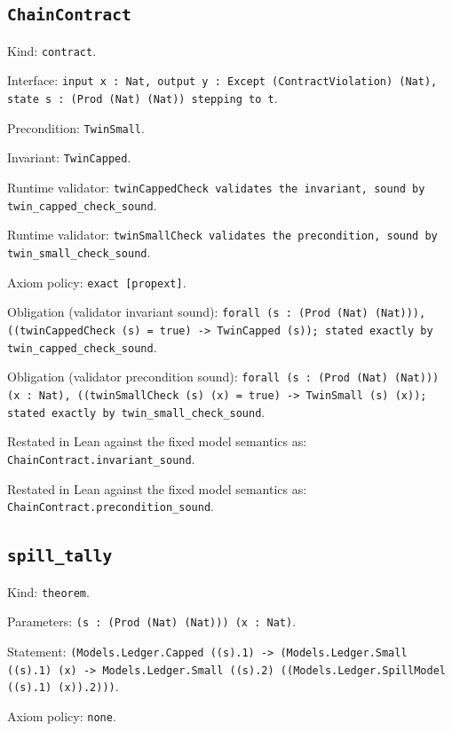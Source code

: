 \documentclass[11pt]{article}
\begin{document}
\subsection*{\texttt{ChainContract}}
\noindent Kind: \texttt{contract}.\par
\noindent Interface: \texttt{input x : Nat, output y : Except (ContractViolation) (Nat), state s : (Prod (Nat) (Nat)) stepping to t}.\par
\noindent Precondition: \texttt{TwinSmall}.\par
\noindent Invariant: \texttt{TwinCapped}.\par
\noindent Runtime validator: \texttt{twinCappedCheck validates the invariant, sound by twin\_capped\_check\_sound}.\par
\noindent Runtime validator: \texttt{twinSmallCheck validates the precondition, sound by twin\_small\_check\_sound}.\par
\noindent Axiom policy: \texttt{exact [propext]}.\par
\noindent Obligation (validator invariant sound): \texttt{forall (s : (Prod (Nat) (Nat))), ((twinCappedCheck (s) = true) -> TwinCapped (s)); stated exactly by twin\_capped\_check\_sound}.\par
\noindent Obligation (validator precondition sound): \texttt{forall (s : (Prod (Nat) (Nat))) (x : Nat), ((twinSmallCheck (s) (x) = true) -> TwinSmall (s) (x)); stated exactly by twin\_small\_check\_sound}.\par
\noindent Restated in Lean against the fixed model semantics as: \texttt{ChainContract.invariant\_sound}.\par
\noindent Restated in Lean against the fixed model semantics as: \texttt{ChainContract.precondition\_sound}.\par
\subsection*{\texttt{spill\_tally}}
\noindent Kind: \texttt{theorem}.\par
\noindent Parameters: \texttt{(s : (Prod (Nat) (Nat))) (x : Nat)}.\par
\noindent Statement: \texttt{(Models.Ledger.Capped ((s).1) -> (Models.Ledger.Small ((s).1) (x) -> Models.Ledger.Small ((s).2) ((Models.Ledger.SpillModel ((s).1) (x)).2)))}.\par
\noindent Axiom policy: \texttt{none}.\par
\end{document}
